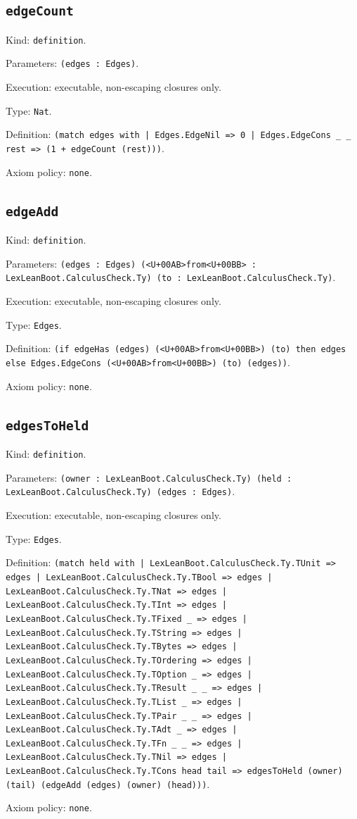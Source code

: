 \documentclass[11pt]{article}
\begin{document}
\subsection*{\texttt{edgeCount}}
\noindent Kind: \texttt{definition}.\par
\noindent Parameters: \texttt{(edges : Edges)}.\par
\noindent Execution: executable, non-escaping closures only.\par
\noindent Type: \texttt{Nat}.\par
\noindent Definition: \texttt{(match edges with | Edges.EdgeNil => 0 | Edges.EdgeCons \_ \_ rest => (1 + edgeCount (rest)))}.\par
\noindent Axiom policy: \texttt{none}.\par
\subsection*{\texttt{edgeAdd}}
\noindent Kind: \texttt{definition}.\par
\noindent Parameters: \texttt{(edges : Edges) (<U+00AB>from<U+00BB> : LexLeanBoot.CalculusCheck.Ty) (to : LexLeanBoot.CalculusCheck.Ty)}.\par
\noindent Execution: executable, non-escaping closures only.\par
\noindent Type: \texttt{Edges}.\par
\noindent Definition: \texttt{(if edgeHas (edges) (<U+00AB>from<U+00BB>) (to) then edges else Edges.EdgeCons (<U+00AB>from<U+00BB>) (to) (edges))}.\par
\noindent Axiom policy: \texttt{none}.\par
\subsection*{\texttt{edgesToHeld}}
\noindent Kind: \texttt{definition}.\par
\noindent Parameters: \texttt{(owner : LexLeanBoot.CalculusCheck.Ty) (held : LexLeanBoot.CalculusCheck.Ty) (edges : Edges)}.\par
\noindent Execution: executable, non-escaping closures only.\par
\noindent Type: \texttt{Edges}.\par
\noindent Definition: \texttt{(match held with | LexLeanBoot.CalculusCheck.Ty.TUnit => edges | LexLeanBoot.CalculusCheck.Ty.TBool => edges | LexLeanBoot.CalculusCheck.Ty.TNat => edges | LexLeanBoot.CalculusCheck.Ty.TInt => edges | LexLeanBoot.CalculusCheck.Ty.TFixed \_ => edges | LexLeanBoot.CalculusCheck.Ty.TString => edges | LexLeanBoot.CalculusCheck.Ty.TBytes => edges | LexLeanBoot.CalculusCheck.Ty.TOrdering => edges | LexLeanBoot.CalculusCheck.Ty.TOption \_ => edges | LexLeanBoot.CalculusCheck.Ty.TResult \_ \_ => edges | LexLeanBoot.CalculusCheck.Ty.TList \_ => edges | LexLeanBoot.CalculusCheck.Ty.TPair \_ \_ => edges | LexLeanBoot.CalculusCheck.Ty.TAdt \_ => edges | LexLeanBoot.CalculusCheck.Ty.TFn \_ \_ => edges | LexLeanBoot.CalculusCheck.Ty.TNil => edges | LexLeanBoot.CalculusCheck.Ty.TCons head tail => edgesToHeld (owner) (tail) (edgeAdd (edges) (owner) (head)))}.\par
\noindent Axiom policy: \texttt{none}.\par
\end{document}
